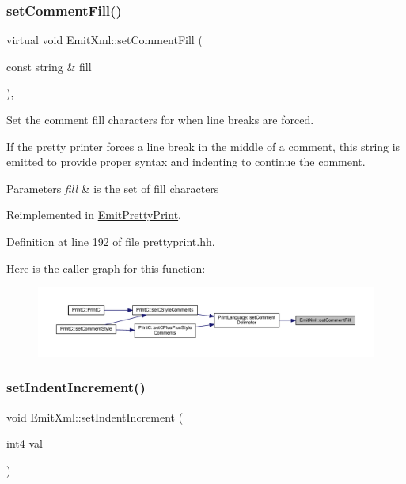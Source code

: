 \subsubsection{\texorpdfstring{setCommentFill()}{setCommentFill()}}
{\footnotesize\ttfamily virtual void Emit\+Xml\+::set\+Comment\+Fill (\begin{DoxyParamCaption}\item[{const string \&}]{fill }\end{DoxyParamCaption})\hspace{0.3cm}{\ttfamily [inline]}, {\ttfamily [virtual]}}



Set the comment fill characters for when line breaks are forced. 

If the pretty printer forces a line break in the middle of a comment, this string is emitted to provide proper syntax and indenting to continue the comment. 
\begin{DoxyParams}{Parameters}
{\em fill} & is the set of fill characters \\
\hline
\end{DoxyParams}


Reimplemented in \mbox{\hyperlink{class_emit_pretty_print_a6e429a78f31bc1e30f902dbd4de21006}{Emit\+Pretty\+Print}}.



Definition at line 192 of file prettyprint.\+hh.

Here is the caller graph for this function\+:
\nopagebreak
\begin{figure}[H]
\begin{center}
\leavevmode
\includegraphics[width=350pt]{class_emit_xml_a51e2d9c79cebe75ed8e33bb7513d86cf_icgraph}
\end{center}
\end{figure}
\mbox{\label{class_emit_xml_a969e2ff4d893610fdb54d6895d7a741f}} 
\subsubsection{\texorpdfstring{setIndentIncrement()}{setIndentIncrement()}}
{\footnotesize\ttfamily void Emit\+Xml\+::set\+Indent\+Increment (\begin{DoxyParamCaption}\item[{int4}]{val }\end{DoxyParamCaption})\hspace{0.3cm}{\ttfamily [inline]}}




